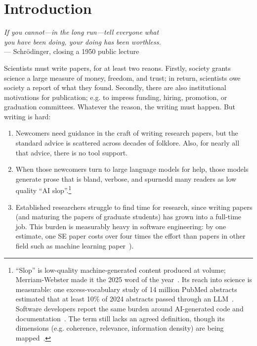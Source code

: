 \section{Introduction}

\begin{flushright}
{\em If you cannot---in the long run---tell everyone what\\ you have
been doing, your doing has been worthless.}\\ --- Schr\"odinger,
closing a 1950 public lecture~\cite{schrodinger51}
\end{flushright}

Scientists must write papers, for at least two reaons.
Firstly, society grants science a large measure of money, freedom, and
trust; in return, scientists owe society a report of what they found.
Secondly, there are also institutional motivations for publication;
e.g. to impress funding, hiring, promotion, or graduation committees.
Whatever the reason, the writing must happen.
But writing is hard:
\begin{enumerate}
\item Newcomers need guidance in the craft of writing research papers,
but the standard advice is scattered across decades of folklore.
Also, for nearly all that advice, there is no tool support.
\item When those newcomers turn to large language models for help,
those models generate prose that is bland, verbose, and spurnedd many
readers as low quality ``AI slop''.\footnote{``Slop'' is low-quality
machine-generated content produced at volume; Merriam-Webster made it
the 2025 word of the year~\cite{mw25slop}.
Its reach into science is measurable: one excess-vocabulary study of
14 million PubMed abstracts estimated that at least 10\% of 2024
abstracts passed through an LLM~\cite{kobak24}.
Software developers report the same burden around AI-generated code
and documentation~\cite{baltes26}.
The term still lacks an agreed definition, though its dimensions (e.g.
coherence, relevance, information density) are being
mapped~\cite{shaib25}.}
\item Established researchers struggle to find time for research,
since writing papers (and maturing the papers of graduate students)
has grown into a full-time job.
This burden is measurably heavy in software engineering: by one
estimate, one SE paper costs over four times the effort than papers in
other field such as machine learning paper~\cite{luo25,menzies26se}).
\end{enumerate}
